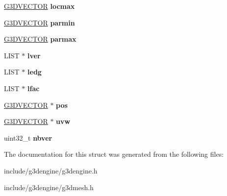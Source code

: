 \begin{DoxyCompactItemize}
\hyperlink{struct__G3DVECTOR}{G3\+D\+V\+E\+C\+T\+OR} {\bfseries locmax}
\item 
\mbox{\label{struct__G3DFFD_a67c2e787a319b6bb75c194ac140eeb12}} 
\hyperlink{struct__G3DVECTOR}{G3\+D\+V\+E\+C\+T\+OR} {\bfseries parmin}
\item 
\mbox{\label{struct__G3DFFD_accff857321abaa262377c7188f45eb5b}} 
\hyperlink{struct__G3DVECTOR}{G3\+D\+V\+E\+C\+T\+OR} {\bfseries parmax}
\item 
\mbox{\label{struct__G3DFFD_abea0b1f70233530df7d3596e8adbf586}} 
L\+I\+ST $\ast$ {\bfseries lver}
\item 
\mbox{\label{struct__G3DFFD_a98f4d04506e65541b8a9d52967969e82}} 
L\+I\+ST $\ast$ {\bfseries ledg}
\item 
\mbox{\label{struct__G3DFFD_a6488defa23520bf9b8806f1cfa83ee15}} 
L\+I\+ST $\ast$ {\bfseries lfac}
\item 
\mbox{\label{struct__G3DFFD_acde7d7c332293701e9148d930bf4e48e}} 
\hyperlink{struct__G3DVECTOR}{G3\+D\+V\+E\+C\+T\+OR} $\ast$ {\bfseries pos}
\item 
\mbox{\label{struct__G3DFFD_a8a3a4f35ad7440ac48c87a42f8e7b98d}} 
\hyperlink{struct__G3DVECTOR}{G3\+D\+V\+E\+C\+T\+OR} $\ast$ {\bfseries uvw}
\item 
\mbox{\label{struct__G3DFFD_a7383439cc65410e15d6ba98742de1741}} 
uint32\+\_\+t {\bfseries nbver}
\end{DoxyCompactItemize}


The documentation for this struct was generated from the following files\+:\begin{DoxyCompactItemize}
\item 
include/g3dengine/g3dengine.\+h\item 
include/g3dengine/g3dmesh.\+h\end{DoxyCompactItemize}
